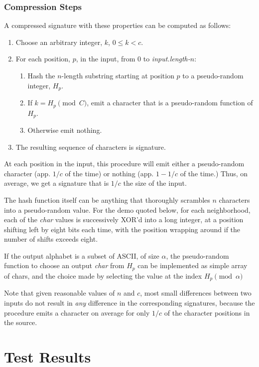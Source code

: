 \documentclass[html]{article}    %
\begin{document}
\subsubsection{Compression Steps}
A compressed signature with these properties can be computed as follows:
\begin{enumerate}
  	\item {
  		Choose an arbitrary integer, $k$, $0\leq k < c$.
	}
	\item{For each position, $p$, in the input, from $0$ to {\em input.length-$n$}:
		\begin{enumerate}
			\item {Hash the $n$-length substring starting at position $p$ to a pseudo-random integer, $H_{p}$.}
			\item { If $k=H_{p}\pmod C$, emit a character that is a pseudo-random function of $H_{p}$. }
			\item { Otherwise emit nothing.}
		\end{enumerate}
	}	
	\item {The resulting sequence of characters is signature.}
\end{enumerate}

At each position in the input, this procedure will emit either a pseudo-random character (app. $1/c$ of the time) or nothing (app. $1-1/c$ of the
time.) Thus, on average, we get a signature that is $1/c$ the size of the input.

The hash function itself can be anything that thoroughly scrambles $n$ characters into a pseudo-random value. 
For the demo quoted below, for each neighborhood, each of the {\em char} values is successively XOR'd into a long integer, at a position shifting 
left by eight bits each time, with the position wrapping around if the number of 
shifts exceeds eight.

If the output alphabet is a subset of ASCII, of size $\alpha$, the pseudo-random function to choose an output {\em char} from $H_{p}$ can be implemented as simple 
array of chars, and the choice made by selecting the value at the index $H_{p}\pmod\alpha$ 

Note that given reasonable values of $n$ and $c$, most small differences between two inputs do not result in {\em any} difference in the 
corresponding signatures, because the procedure emits a character on average for only $1/c$ of the character positions in the source.

\section{Test Results}
\end{document}
